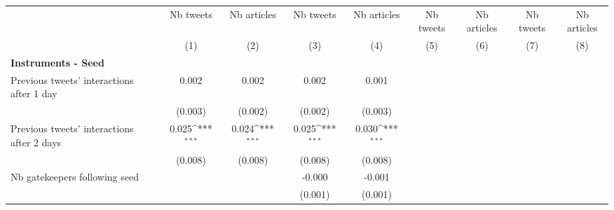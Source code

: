 {
\def\sym#1{\ifmmode^{#1}\else\(^{#1}\)\fi}
\begin{tabular}{l*{8}{c}}
\hline\hline
                    &\multicolumn{1}{c}{Nb tweets}&\multicolumn{1}{c}{Nb articles}&\multicolumn{1}{c}{Nb tweets}&\multicolumn{1}{c}{Nb articles}&\multicolumn{1}{c}{Nb tweets}&\multicolumn{1}{c}{Nb articles}&\multicolumn{1}{c}{Nb tweets}&\multicolumn{1}{c}{Nb articles}\\\cmidrule(lr){2-2}\cmidrule(lr){3-3}\cmidrule(lr){4-4}\cmidrule(lr){5-5}\cmidrule(lr){6-6}\cmidrule(lr){7-7}\cmidrule(lr){8-8}\cmidrule(lr){9-9}
                    &\multicolumn{1}{c}{(1)}         &\multicolumn{1}{c}{(2)}         &\multicolumn{1}{c}{(3)}         &\multicolumn{1}{c}{(4)}         &\multicolumn{1}{c}{(5)}         &\multicolumn{1}{c}{(6)}         &\multicolumn{1}{c}{(7)}         &\multicolumn{1}{c}{(8)}         \\
\hline
\textbf{Instruments - Seed}&                     &                     &                     &                     &                     &                     &                     &                     \\
Previous tweets' interactions after 1 day&       0.002         &       0.002         &       0.002         &       0.001         &                     &                     &                     &                     \\
                    &     (0.003)         &     (0.002)         &     (0.002)         &     (0.003)         &                     &                     &                     &                     \\
Previous tweets' interactions after 2 days&       0.025\sym{***}&       0.024\sym{***}&       0.025\sym{***}&       0.030\sym{***}&                     &                     &                     &                     \\
                    &     (0.008)         &     (0.008)         &     (0.008)         &     (0.008)         &                     &                     &                     &                     \\
Nb gatekeepers following seed&                     &                     &      -0.000         &      -0.001         &                     &                     &                     &                     \\
                    &                     &                     &     (0.001)         &     (0.001)         &                     &                     &                     &                     \\

\end{tabular}}
